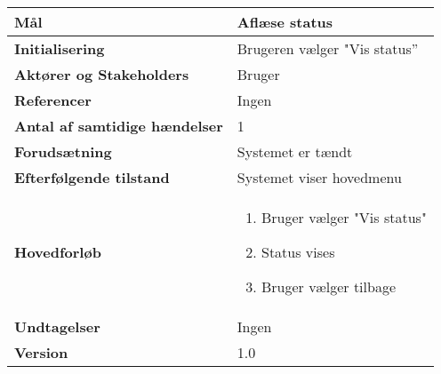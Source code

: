 \begin{table}[H] \centering
\begin{tabular}{|p{6cm}|p{8cm}|}
	\hline
\textbf{Mål}	&
Aflæse status \\\hline
\textbf{Initialisering} &
Brugeren vælger "Vis status” \\\hline
\textbf{Aktører og Stakeholders} &
Bruger \\\hline
\textbf{Referencer} &
Ingen \\\hline
\textbf{Antal af samtidige hændelser} &
1 \\\hline
\textbf{Forudsætning} &
Systemet er tændt \\\hline
\textbf{Efterfølgende tilstand} &
Systemet viser hovedmenu \\\hline
\textbf{Hovedforløb} &
\begin{enumerate}
\item Bruger vælger "Vis status"
\item Status vises
\item Bruger vælger tilbage
\end{enumerate} \\\hline
\textbf{Undtagelser} &
Ingen \\\hline
		\textbf{Version}		&1.0 \\\hline
	\end{tabular}
	\label{UC3} 
\end{table}